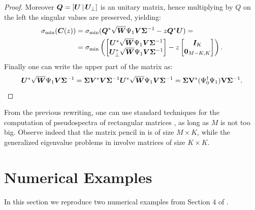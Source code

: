 \begin{proof}
Moreover $\vb*{Q} = [\vb*{U}\,\lvert\,\vb*{U}_\perp]$ is an unitary matrix, hence multiplying by $Q$ on the left the singular values are preserved, yielding:
\begin{equation*}
    \begin{split}
        \sigma_{\min}(\vb*{C}(z)) &= \sigma_{\min}(\vb*{Q}^*\sqrt{\vb*{W}}\Psi_1\vb*{V}\bm{\Sigma}^{-1} - z\vb*{Q}^*\vb*{U}) = \\
        & = \sigma_{\min}\left( 
        \begin{bmatrix}
        \vb*{U}^*\sqrt{\vb*{W}}\Psi_1 \vb*{V}\bm{\Sigma}^{-1}\\
        \vb*{U}_{\perp}^*\sqrt{\vb*{W}}\Psi_1 \vb*{V}\bm{\Sigma}^{-1}
        \end{bmatrix} - z 
        \begin{bmatrix}
        \vb*{I}_K\\
        \vb*{0}_{M-K, K}\\
        \end{bmatrix}
        \right).
    \end{split}
\end{equation*}
Finally one can write the upper part of the matrix as:
\begin{equation*}
    \vb*{U}^*\sqrt{\vb*{W}}\Psi_1 \vb*{V}\bm{\Sigma}^{-1} = \bm{\Sigma} \vb*{V}^* \vb*{V}\bm{\Sigma}^{-1}\vb*{U}^*\sqrt{\vb*{W}}\Psi_1 \vb*{V}\bm{\Sigma}^{-1} = \bm{\Sigma}\vb{V}^*(\Psi_0^\dagger \Psi_1)\vb{V}\bm{\Sigma}^{-1}.
\end{equation*}
\end{proof}

From the previous rewriting, one can use standard techniques for the computation of pseudospectra of rectangular matrices \cite{wright_pseudospectra_2002}, as long as $M$ is not too big. Observe indeed that the matrix pencil in  is of size $M\times K$, while the generalized eigenvalue problems in  involve matrices of size $K\times K$.

\section{Numerical Examples}
\label{section_experiments}
In this section we reproduce two numerical examples from Section 4 of \cite{colbrook_rigorous_2021}.

